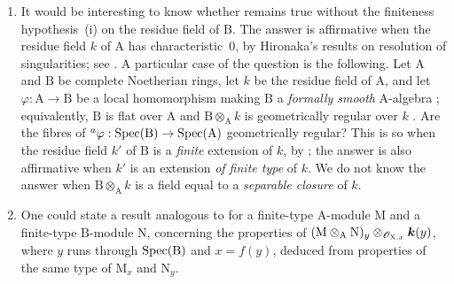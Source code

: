 \begin{remarks}[7.5.4]
\label{IV.7.5.4}
\begin{enumerate}[label=(\roman*)]
  \item It would be interesting to know whether  remains true without the finiteness hypothesis~(i) on the residue field of $\mathrm{B}$. The answer is affirmative when the residue field $k$ of $\mathrm{A}$ has characteristic~$0$, by Hironaka's results on resolution of singularities; see . A particular case of the question is the following. Let $\mathrm{A}$ and $\mathrm{B}$ be complete Noetherian rings, let $k$ be the residue field of $\mathrm{A}$, and let $\varphi:\mathrm{A}\to\mathrm{B}$ be a local homomorphism making $\mathrm{B}$ a \emph{formally smooth} $\mathrm{A}$-algebra ; equivalently, $\mathrm{B}$ is flat over $\mathrm{A}$ and $\mathrm{B}\otimes_\mathrm{A}k$ is geometrically regular over $k$ . Are the fibres of ${}^a\varphi:\operatorname{Spec}(\mathrm{B})\to\operatorname{Spec}(\mathrm{A})$ geometrically regular? This is so when the residue field $k'$ of $\mathrm{B}$ is a \emph{finite} extension of $k$, by ; the answer is also affirmative when $k'$ is an extension \emph{of finite type} of $k$. We do not know the answer when $\mathrm{B}\otimes_\mathrm{A}k$ is a field equal to a \emph{separable closure} of $k$.

  \item One could state a result analogous to  for a finite-type $\mathrm{A}$-module $\mathrm{M}$ and a finite-type $\mathrm{B}$-module $\mathrm{N}$, concerning the properties of $(\mathrm{M}\otimes_\mathrm{A}\mathrm{N})_y
\otimes_{\mathscr{O}_{\mathrm{X},x}}\boldsymbol{k}(y)$,
  where $y$ runs through $\operatorname{Spec}(\mathrm{B})$ and $x=f(y)$, deduced from properties of the same type of $\mathrm{M}_x$ and $\mathrm{N}_y$.


\end{enumerate}
\end{remarks}
